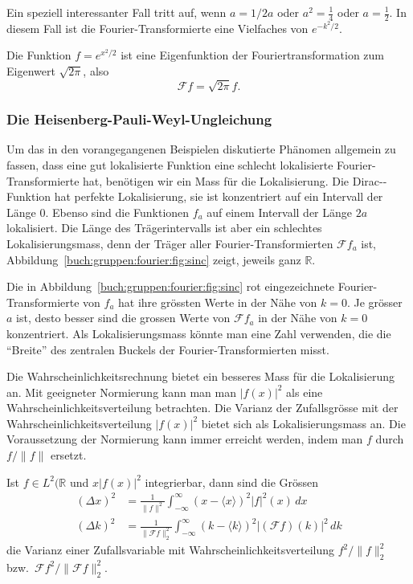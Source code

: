 Ein speziell interessanter Fall tritt auf, wenn $a=1/2a$ oder
$a^2=\frac14$ oder $a=\frac12$.
In diesem Fall ist die Fourier-Transformierte eine Vielfaches von
$e^{-k^2/2}$.

\begin{satz}
\label{buch:gruppen:fourier:satz:gausseigen}
Die Funktion $f=e^{x^2/2}$ ist eine Eigenfunktion der Fouriertransformation
zum Eigenwert $\!\sqrt{2\pi}$, also
\[
\mathscr{F}f = \!\sqrt{2\pi} f.
\]
\end{satz}

%
%
\subsubsection{Die Heisenberg-Pauli-Weyl-Ungleichung}
Um das in den vorangegangenen Beispielen diskutierte Phänomen allgemein
zu fassen, dass eine gut lokalisierte Funktion eine schlecht lokalisierte
Fourier-Transformierte hat, benötigen wir ein Mass für die Lokalisierung.
Die Dirac-\textdelta-Funktion hat perfekte Lokalisierung, sie ist 
konzentriert auf ein Intervall der Länge $0$.
Ebenso sind die Funktionen $f_a$ auf einem Intervall der Länge $2a$
lokalisiert.
Die Länge des Trägerintervalls ist aber ein schlechtes Lokalisierungsmass,
denn der Träger aller Fourier-Transformierten $\mathscr{F}f_a$ ist,
Abbildung~\ref{buch:gruppen:fourier:fig:sinc} zeigt,
jeweils ganz $\mathbb{R}$.

Die in Abbildung~\ref{buch:gruppen:fourier:fig:sinc}
rot eingezeichnete Fourier-Transformierte von $f_a$ hat ihre grössten 
Werte in der Nähe von $k=0$.
Je grösser $a$ ist, desto besser sind die grossen Werte von $\mathscr{F}f_a$
in der Nähe von $k=0$ konzentriert.
Als Lokalisierungsmass könnte man eine Zahl verwenden, die die ``Breite''
des zentralen Buckels der Fourier-Transformierten misst.

Die Wahrscheinlichkeitsrechnung bietet ein besseres Mass für die
Lokalisierung an.
Mit geeigneter Normierung kann man man $|f(x)|^2$ als eine
Wahrscheinlichkeitsverteilung betrachten.
Die Varianz der Zufallsgrösse mit der Wahrscheinlichkeitsverteilung
$|f(x)|^2$ bietet sich als Lokalisierungsmass an.
Die Voraussetzung der Normierung kann immer erreicht werden, indem man
$f$ durch $f/\|f\|$ ersetzt.


\begin{definition}
Ist $f\in L^2(\mathbb{R}$ und $x|f(x)|^2$ integrierbar, dann sind
die Grössen
\begin{align*}
(\Delta x)^2
&=
\frac{1}{\|f\|^2}
\int_{-\infty}^\infty
(x-\langle x\rangle)^2
|f|^2(x)
\,dx
\\
(\Delta k)^2
&=
\frac{1}{\|\mathscr{F}f\|_2^2}
\int_{-\infty}^\infty
(k-\langle k\rangle)^2
|(\mathscr{F}f)(k)|^2
\,dk
\end{align*}
die Varianz einer Zufallsvariable mit Wahrscheinlichkeitsverteilung
$f^2/\|f\|_2^2$ bzw.~$\mathscr{F}f^2/\|\mathscr{F}f\|_2^2$.
\end{definition}

